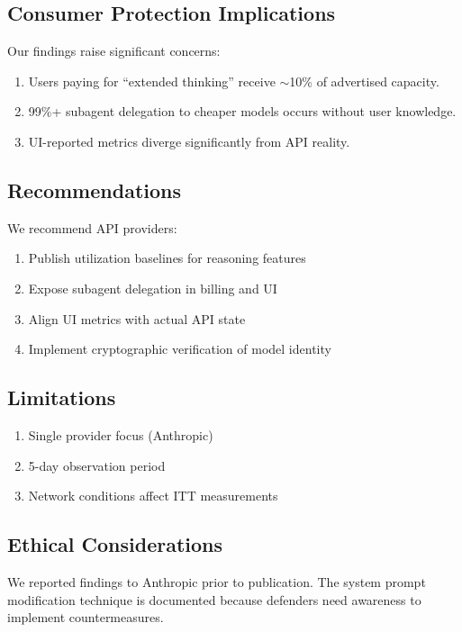 \documentclass[11pt,a4paper]{article}
\begin{document}
\subsection{Consumer Protection Implications}

Our findings raise significant concerns:
\begin{enumerate}
    \item Users paying for ``extended thinking'' receive $\sim$10\% of advertised capacity.
    \item 99\%+ subagent delegation to cheaper models occurs without user knowledge.
    \item UI-reported metrics diverge significantly from API reality.
\end{enumerate}

\subsection{Recommendations}

We recommend API providers:
\begin{enumerate}
    \item Publish utilization baselines for reasoning features
    \item Expose subagent delegation in billing and UI
    \item Align UI metrics with actual API state
    \item Implement cryptographic verification of model identity
\end{enumerate}

\subsection{Limitations}

\begin{enumerate}
    \item Single provider focus (Anthropic)
    \item 5-day observation period
    \item Network conditions affect ITT measurements
\end{enumerate}

\subsection{Ethical Considerations}

We reported findings to Anthropic prior to publication. The system prompt modification technique is documented because defenders need awareness to implement countermeasures.
\end{document}
